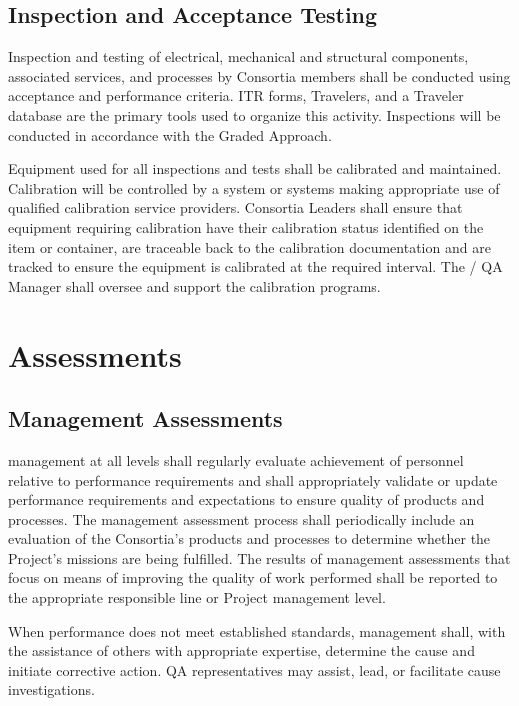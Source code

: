 \subsection{Inspection and Acceptance Testing}

Inspection and testing of electrical, mechanical and structural
components, associated services, and processes by Consortia members
shall be conducted using acceptance and performance criteria. ITR
forms, Travelers, and a Traveler database are the primary tools used
to organize this activity. Inspections will be conducted in accordance
with the Graded Approach.

Equipment used for all inspections and tests shall be calibrated and
maintained. Calibration will be controlled by a system or systems
making appropriate use of qualified calibration service
providers. Consortia Leaders shall ensure that equipment requiring
calibration have their calibration status identified on the item or
container, are traceable back to the calibration documentation and are
tracked to ensure the equipment is calibrated at the required
interval. The / QA Manager shall oversee and support the 
calibration programs.

\section{Assessments}

\subsection{Management Assessments}

 management at all levels shall regularly evaluate achievement of
personnel relative to performance requirements and shall appropriately
validate or update performance requirements and expectations to ensure
quality of products and processes. The management assessment process
shall periodically include an evaluation of the Consortia's products
and processes to determine whether the Project's missions are being
fulfilled. The results of management assessments that focus on means
of improving the quality of work performed shall be reported to the
appropriate responsible line or Project management level.

When performance does not meet established standards, management
shall, with the assistance of others with appropriate expertise,
determine the cause and initiate corrective action. QA representatives
may assist, lead, or facilitate cause investigations.

